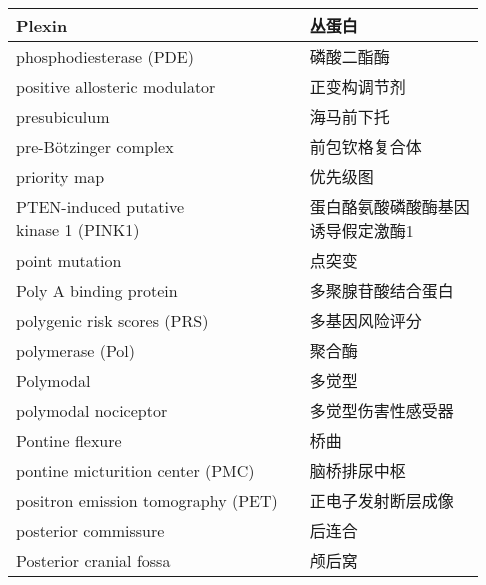 \begin{longtable}{lll}
	\midrule
	Plexin   && 丛蛋白   \\
	
	\midrule
	phosphodiesterase (PDE)  && 磷酸二酯酶   \\
	
	\midrule
	positive allosteric modulator   && 正变构调节剂   \\
	
	\midrule
	presubiculum   && 海马前下托   \\
	
	\midrule
	pre-Bötzinger complex   && 前包钦格复合体   \\
	
	\midrule
	priority map   && 优先级图   \\
	
	\midrule
	\makecell[l]{PTEN-induced putative \\kinase 1 (PINK1)}     && \makecell[l]{蛋白酪氨酸磷酸酶基因\\诱导假定激酶1}   \\
	
	\midrule
	point mutation     && 点突变   \\
	
	\midrule
	Poly A binding protein     && 多聚腺苷酸结合蛋白   \\
	
	\midrule
	polygenic risk scores (PRS)     && 多基因风险评分   \\
	
	\midrule
	polymerase (Pol)     && 聚合酶   \\
	
	\midrule
	Polymodal     && 多觉型   \\
	
	\midrule
	polymodal nociceptor     && 多觉型伤害性感受器   \\
	
	\midrule
	Pontine flexure     && 桥曲   \\
	
	\midrule
	pontine micturition center  (PMC)   && 脑桥排尿中枢   \\
	
	\midrule
	positron emission tomography (PET)     && 正电子发射断层成像   \\
	
	\midrule
	posterior commissure     && 后连合   \\
	
	\midrule
	Posterior cranial fossa     && 颅后窝   \\
	

\end{longtable}

